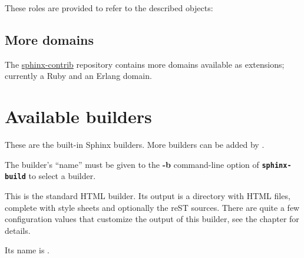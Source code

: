 \documentclass[letterpaper,10pt,english]{sphinxmanual}
\begin{document}
\label{domains:rst-roles}
These roles are provided to refer to the described objects:

\begin{fulllineitems}
\label{domains:role-rst:dir}\label{domains:role-rst:role}
\end{fulllineitems}



\section{More domains}
\label{domains:more-domains}
The \href{https://bitbucket.org/birkenfeld/sphinx-contrib/}{sphinx-contrib} repository contains more domains available as extensions;
currently a Ruby and an Erlang domain.


\chapter{Available builders}
\label{builders::doc}\label{builders:module-sphinx.builders}\label{builders:sphinx-contrib}\label{builders:available-builders}\label{builders:builders}
These are the built-in Sphinx builders.  More builders can be added by
{\hyperref[extensions:extensions]{}}.

The builder's ``name'' must be given to the \textbf{-b} command-line option of
\textbf{\texttt{sphinx-build}} to select a builder.
\label{builders:module-sphinx.builders.html}

\begin{fulllineitems}
\label{builders:sphinx.builders.html.StandaloneHTMLBuilder}
This is the standard HTML builder.  Its output is a directory with HTML
files, complete with style sheets and optionally the reST sources.  There are
quite a few configuration values that customize the output of this builder,
see the chapter {\hyperref[config:html\string-options]{}} for details.

Its name is .

\end{fulllineitems}
\end{document}
